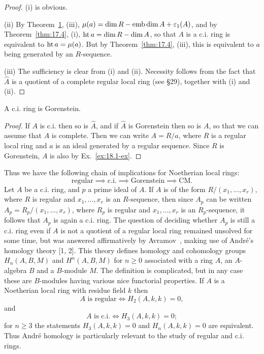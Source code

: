 \begin{proof}
(i) is obvious.

(ii) By Theorem~\hyperref[thm:21.1]{1}, (iii), $\mu(a) = \dim R - \operatorname{emb\,dim} A + \varepsilon_1(A)$, and by
Theorem~\ref{thm:17.4}, (i), $\operatorname{ht} a = \dim R - \dim A$, so that $A$ is a c.i. ring is equivalent
to $\operatorname{ht} a = \mu(a)$. But by Theorem~\ref{thm:17.4}, (iii), this is equivalent to $a$ being
generated by an $R$-sequence.

(iii) The sufficiency is clear from (i) and (ii). Necessity follows from the
fact that $\hat{A}$ is a quotient of a complete regular local ring (see \S29), together
with (i) and (ii).
\end{proof}

\begin{theorem}\label{thm:21.3}
A c.i. ring is Gorenstein.
\end{theorem}

\begin{proof}
If $A$ is c.i. then so is $\hat{A}$, and if $\hat{A}$ is Gorenstein then so is $A$, so that we
can assume that $A$ is complete. Then we can write $A = R/a$, where $R$ is a
regular local ring and $a$ is an ideal generated by a regular sequence. Since $R$
is Gorenstein, $A$ is also by Ex.~\ref{ex:18.1-ex}.
\end{proof}

Thus we have the following chain of implications for Noetherian local
rings:
\[
  \text{regular} \implies \text{c.i.} \implies \text{Gorenstein} \implies \text{CM}.
\]
Let $A$ be a c.i. ring, and $p$ a prime ideal of $A$. If $A$ is of the form
$R/(x_1, \ldots, x_r)$, where $R$ is regular and $x_1, \ldots, x_r$ is an $R$-sequence, then
since $A_p$ can be written $A_p = R_p/(x_1, \ldots, x_r)$, where $R_p$ is regular and
$x_1, \ldots, x_r$ is an $R_p$-sequence, it follows that $A_p$ is again a c.i. ring. The
question of deciding whether $A_p$ is still a c.i. ring even if $A$ is not a quotient
of a regular local ring remained unsolved for some time, but was answered
affirmatively by Avramov~\cite{Av1}, making use of Andr\'e's homology theory
[1, 2]. %
This theory defines homology and cohomology groups
$H_n(A, B, M)$ and $H^n(A, B, M)$ for $n \ge 0$ associated with a ring $A$, an $A$-algebra $B$
and a $B$-module $M$. The definition is complicated, but in any case these are
$B$-modules having various nice functorial properties. If $A$ is a
Noetherian local ring with residue field $k$ then
\[
  A \text{ is regular} \iff H_2(A, k, k) = 0,
\]
and
\[
  A \text{ is c.i.} \iff H_3(A, k, k) = 0;
\]
for $n \ge 3$ the statements $H_3(A, k, k) = 0$ and $H_n(A, k, k) = 0$ are equivalent.
Thus Andr\'e homology is particularly relevant to the study of regular and
c.i. rings.

